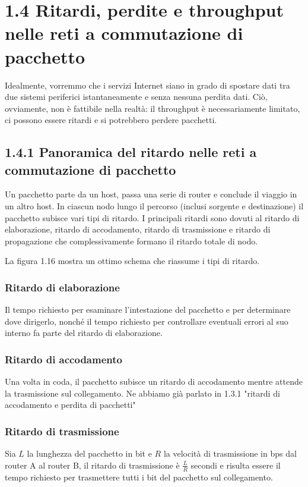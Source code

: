 \documentclass{book}
\begin{document}
\section*{1.4 Ritardi, perdite e throughput nelle reti a commutazione di pacchetto}
Idealmente, vorremmo che i servizi Internet siano in grado di spostare dati tra due sistemi periferici istantaneamente e senza nessuna perdita dati. Ciò, ovviamente, non è fattibile nella realtà: il throughput è necessariamente limitato, ci possono essere ritardi e si potrebbero perdere pacchetti.
	
\subsection*{1.4.1 Panoramica del ritardo nelle reti a commutazione di pacchetto}
Un pacchetto parte da un host, passa una serie di router e conclude il viaggio in un altro host. In ciascun nodo lungo il percorso (inclusi sorgente e destinazione) il pacchetto subisce vari tipi di ritardo. I principali ritardi sono dovuti al ritardo di elaborazione, ritardo di accodamento, ritardo di trasmissione e ritardo di propagazione che complessivamente formano il ritardo totale di nodo. 
	
La figura 1.16 mostra un ottimo schema che riassume i tipi di ritardo.
	
\subsubsection{Ritardo di elaborazione}
Il tempo richiesto per esaminare l'intestazione del pacchetto e per determinare dove dirigerlo, nonché il tempo richiesto per controllare eventuali errori al suo interno fa parte del ritardo di elaborazione.
	
\subsubsection{Ritardo di accodamento}
Una volta in coda, il pacchetto subisce un ritardo di accodamento mentre attende la trasmissione sul collegamento. Ne abbiamo già parlato in 1.3.1 "ritardi di accodamento e perdita di pacchetti"
	
\subsubsection{Ritardo di trasmissione}
Sia $L$ la lunghezza del pacchetto in bit e $R$ la velocità di trasmissione in bps dal router A al router B, il ritardo di trasmissione è $\frac{L}{R}$ secondi e risulta essere il tempo richiesto per trasmettere tutti i bit del pacchetto sul collegamento.
\end{document}
